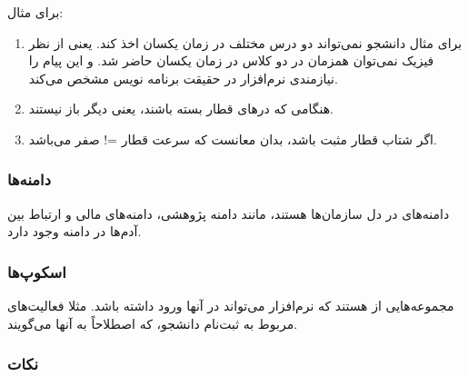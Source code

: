 برای مثال:

\begin{enumerate}
    \item برای مثال دانشجو نمی‌تواند دو درس مختلف در زمان یکسان اخذ کند. یعنی از
    نظر فیزیک نمی‌توان همزمان در دو کلاس در زمان یکسان حاضر شد. و این پیام را
    نیازمندی نرم‌افزار در حقیقت برنامه نویس مشخص می‌کند.
    \item هنگامی که در‌های قطار بسته باشند، یعنی دیگر باز نیستند.
    \item اگر شتاب قطار مثبت باشد، بدان معانست که سرعت قطار =! صفر می‌باشد.
\end{enumerate}

\subsubsection{دامنه‌ها}

دامنه‌های در دل سازمان‌ها هستند، مانند دامنه پژوهشی، دامنه‌های مالی و ارتباط بین
آدم‌ها در دامنه وجود دارد.

\subsubsection{اسکوپ‌ها}

مجموعه‌هایی از  هستند که نرم‌افزار می‌تواند در آنها ورود
داشته باشد. مثلا فعالیت‌های مربوط به ثبت‌نام دانشجو، که اصطلاحاً به آنها
 می‌گویند.

\subsubsection*{نکات}

